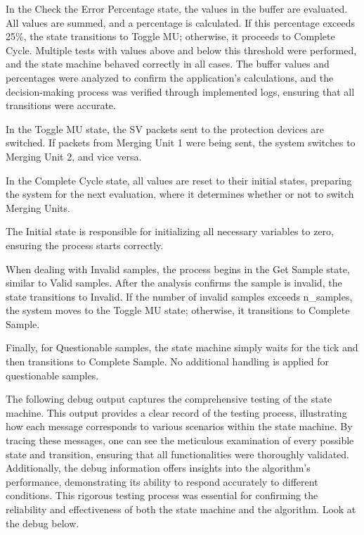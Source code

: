 In the Check the Error Percentage state, the values in the buffer are evaluated. All values are summed, and a percentage is calculated. If this percentage exceeds 25\%, the state transitions to Toggle MU; otherwise, it proceeds to Complete Cycle. Multiple tests with values above and below this threshold were performed, and the state machine behaved correctly in all cases. The buffer values and percentages were analyzed to confirm the application's calculations, and the decision-making process was verified through implemented logs, ensuring that all transitions were accurate.

In the Toggle MU state, the SV packets sent to the protection devices are switched. If packets from Merging Unit 1 were being sent, the system switches to Merging Unit 2, and vice versa.

In the Complete Cycle state, all values are reset to their initial states, preparing the system for the next evaluation, where it determines whether or not to switch Merging Units.

The Initial state is responsible for initializing all necessary variables to zero, ensuring the process starts correctly.

When dealing with Invalid samples, the process begins in the Get Sample state, similar to Valid samples. After the analysis confirms the sample is invalid, the state transitions to Invalid. If the number of invalid samples exceeds n\_samples, the system moves to the Toggle MU state; otherwise, it transitions to Complete Sample.

Finally, for Questionable samples, the state machine simply waits for the tick and then transitions to Complete Sample. No additional handling is applied for questionable samples.

The following debug output captures the comprehensive testing of the state machine. This output provides a clear record of the testing process, illustrating how each message corresponds to various scenarios within the state machine. By tracing these messages, one can see the meticulous examination of every possible state and transition, ensuring that all functionalities were thoroughly validated. Additionally, the debug information offers insights into the algorithm's performance, demonstrating its ability to respond accurately to different conditions. This rigorous testing process was essential for confirming the reliability and effectiveness of both the state machine and the algorithm. Look at the debug below.


